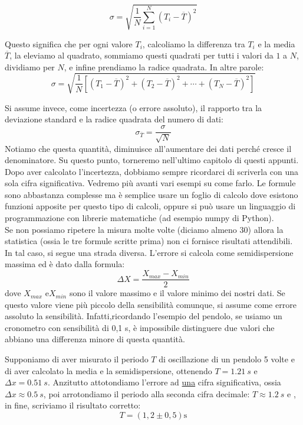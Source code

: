 \[
\sigma = \sqrt{\frac{1}{N} \sum_{i=1}^{N} (T_i - \overline{T})^2}
\]

\noindent
Questo significa che per ogni valore $T_i$, calcoliamo la differenza tra $T_i$ e la media $\overline{T}$, la eleviamo al quadrato, sommiamo questi quadrati per tutti i valori da $1$ a $N$, dividiamo per $N$, e infine prendiamo la radice quadrata. In altre parole:
\[
\sigma = \sqrt{\frac{1}{N} \left[ (T_1 - \overline{T})^2 + (T_2 - \overline{T})^2 + \cdots + (T_N - \overline{T})^2 \right]}
\]

Si assume invece, come incertezza (o errore assoluto), il rapporto tra la deviazione standard e la radice quadrata del numero di dati:
\[
\sigma_{\overline{T}}=\frac{\sigma}{\sqrt{N}}
\] 
Notiamo che questa quantità, diminuisce all'aumentare dei dati perché cresce il denominatore. Su questo punto, torneremo nell'ultimo capitolo di questi appunti.
Dopo aver calcolato l'incertezza, dobbiamo sempre ricordarci di scriverla con una sola cifra significativa. Vedremo più avanti vari esempi su come farlo. Le formule sono abbastanza complesse ma è semplice usare un foglio di calcolo dove esistono funzioni apposite per questo tipo di calcoli, oppure si può usare un linguaggio di programmazione con librerie matematiche (ad esempio numpy di Python). \\

Se non possiamo ripetere la misura molte volte (diciamo almeno 30) allora la statistica (ossia le tre formule scritte prima) non ci fornisce risultati attendibili. In tal caso, si segue una strada diversa. L'errore si calcola come semidispersione massima ed è dato dalla formula:
\[
\Delta X = \frac{X_{max}-X_{min}}{2}
\]
dove $X_{max}$  e$X_{min}$ sono il valore massimo e  il valore minimo dei nostri dati. Se questo valore viene più piccolo della sensibilità comunque, si assume come errore assoluto la sensibilità. Infatti,ricordando l'esempio del pendolo, se usiamo un cronometro con sensibilità di 0,1 s, è impossibile distinguere due valori che abbiano una differenza minore di questa quantità. 

Supponiamo di aver misurato il periodo $T$ di oscillazione di un pendolo 5 volte e di aver calcolato la media e la semidispersione, ottenendo $T=\SI{1,21}{s}$ e $\Delta x = \SI{0,51}{s}$. Anzitutto attotondiamo l'errore ad \underline{una} cifra significativa, ossia $\Delta x \approx \SI{0,5}{s}$, poi arrotondiamo il periodo alla seconda cifra decimale: $T\approx \SI{1,2}{s}$ e , in fine, scriviamo il risultato corretto:
\[
T=\left(1,2 \pm 0,5 \right)\si{\second}
\]  
